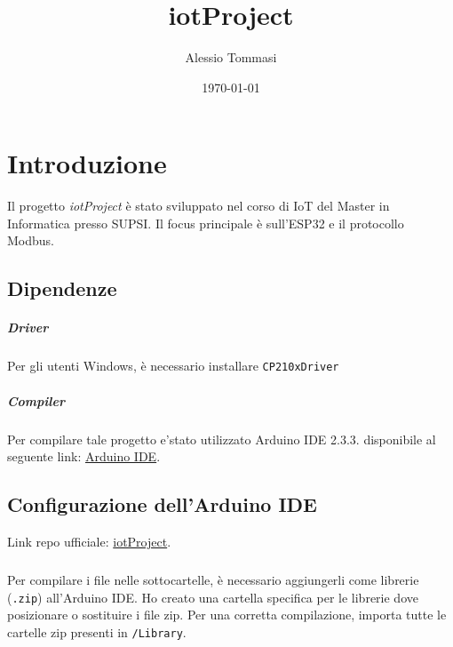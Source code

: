 \documentclass[12pt,a4paper]{report}
\begin{document}
\title{\textbf{iotProject}}
\author{Alessio Tommasi}
\date{\today}

\maketitle

\tableofcontents

\centering
\chapter{Introduzione}

Il progetto \textit{iotProject} è stato sviluppato nel corso di IoT del Master in Informatica presso SUPSI. Il focus principale è sull'ESP32 e il protocollo Modbus.

\section{Dipendenze}

\paragraph{Driver}
Per gli utenti Windows, è necessario installare \texttt{CP210xDriver}
\paragraph{Compiler}
Per compilare tale progetto e'stato utilizzato Arduino IDE 2.3.3.
disponibile al seguente link: \href{https://www.arduino.cc/en/software}{Arduino IDE}.

\section{Configurazione dell'Arduino IDE}

Link repo ufficiale: \href{https://github.com/AlessioTommasi-supsi/iotProject }{iotProject}.

\paragraph{}
Per compilare i file nelle sottocartelle, è necessario aggiungerli come librerie (\texttt{.zip}) all'Arduino IDE. Ho creato una cartella specifica per le librerie dove posizionare o sostituire i file zip. Per una corretta compilazione, importa tutte le cartelle zip presenti in \texttt{/Library}.
\end{document}

